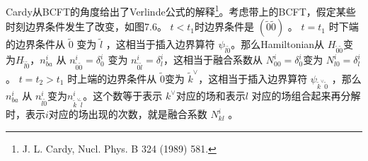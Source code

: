 Cardy从BCFT的角度给出了Verlinde公式的解释\footnote{J. L. Cardy, Nucl. Phys. B 324 (1989) 581.}。考虑带上的BCFT，假定某些时刻边界条件发生了改变，如图7.6。 $t<t_1 $时边界条件是 $(\tilde{0}\tilde{0})$ 。 $t=t_1$ 时下端的边界条件从 $\tilde{0}$ 变为 $\tilde{l}$ ，这相当于插入边界算符 $\psi_{\tilde{l} \tilde{0}} $。那么Hamiltonian从 $H_{\tilde{0} \tilde{0}} $变为$ H_{\tilde{l} \tilde{0}} $，$ n_{b a}^{i}$ 从 $n_{\tilde{0} \tilde{0}}^{i}=\delta_{0}^{i}$ 变为 $n_{\tilde{0} \tilde{l}}^{i}=\delta_{l}^{i} $，这相当于融合系数从 $N_{00}^{i}=\delta_{0}^{i} $变为 $N_{l 0}^{i}=\delta_{l}^{i}$ 。 $t=t_2>t_1$ 时上端的边界条件从 $\tilde{0} $变为 $\tilde{k}^{\vee} $，这相当于插入边界算符 $\psi_{\tilde{k} ^\vee \tilde{0}}$ ，那么 $n_{b a}^{i}$ 从 $n_{\tilde{l}\tilde{0}}^{i} $变为$ n_{\tilde{k}^{\vee} \tilde{l}}^{i} $。这个数等于表示 $k^{\vee} $对应的场和表示$ l$ 对应的场组合起来再分解时，表示$ i $对应的场出现的次数，就是融合系数 $N_{k l}^{i}$ 。





